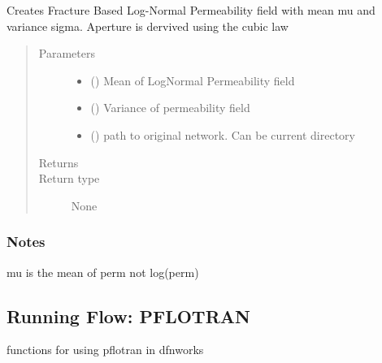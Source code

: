 \documentclass[letterpaper,10pt,english]{sphinxmanual}
\begin{document}
\begin{fulllineitems}
\label{\detokenize{pydfnworks:pydfnworks.dfnFlow.flow.uncorrelated}}
Creates Fracture Based Log-Normal Permeability field with mean mu and variance sigma. Aperture is dervived using the cubic law
\begin{quote}\begin{description}
\item[{Parameters}] \leavevmode\begin{itemize}
\item {} 
 () \textendash{} Mean of LogNormal Permeability field

\item {} 
 () \textendash{} Variance of permeability field

\item {} 
 () \textendash{} path to original network. Can be current directory

\end{itemize}

\item[{Returns}] \leavevmode


\item[{Return type}] \leavevmode
None

\end{description}\end{quote}
\subsubsection*{Notes}

mu is the mean of perm not log(perm)

\end{fulllineitems}



\subsection{Running Flow: PFLOTRAN}
\label{\detokenize{pydfnworks:module-pydfnworks.dfnFlow.pflotran}}\label{\detokenize{pydfnworks:running-flow-pflotran}}
functions for using pflotran in dfnworks
\end{document}
